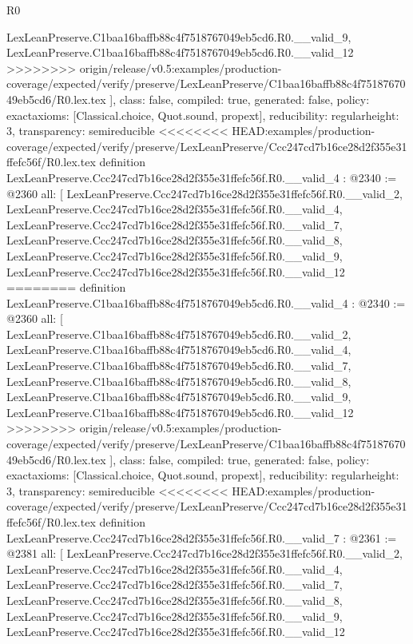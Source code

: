 \begin{lexlean}{R0}
\begin{coremodule}
{{{{{{{{{{{{{{{{{{{{{{{{{{{{{{{{{{{{{{{{{{{{{    LexLeanPreserve.C1baa16baffb88c4f7518767049eb5cd6.R0.__valid_9,
    LexLeanPreserve.C1baa16baffb88c4f7518767049eb5cd6.R0.__valid_12
>>>>>>>> origin/release/v0.5:examples/production-coverage/expected/verify/preserve/LexLeanPreserve/C1baa16baffb88c4f7518767049eb5cd6/R0.lex.tex
  ],
  class: false,
  compiled: true,
  generated: false,
  policy: exact{axioms: [Classical.choice, Quot.sound, propext]},
  reducibility: regular{height: 3},
  transparency: semireducible
}
<<<<<<<< HEAD:examples/production-coverage/expected/verify/preserve/LexLeanPreserve/Ccc247cd7b16ce28d2f355e31ffefc56f/R0.lex.tex
definition LexLeanPreserve.Ccc247cd7b16ce28d2f355e31ffefc56f.R0.__valid_4 : @2340 := @2360 {
  all: [
    LexLeanPreserve.Ccc247cd7b16ce28d2f355e31ffefc56f.R0.__valid_2,
    LexLeanPreserve.Ccc247cd7b16ce28d2f355e31ffefc56f.R0.__valid_4,
    LexLeanPreserve.Ccc247cd7b16ce28d2f355e31ffefc56f.R0.__valid_7,
    LexLeanPreserve.Ccc247cd7b16ce28d2f355e31ffefc56f.R0.__valid_8,
    LexLeanPreserve.Ccc247cd7b16ce28d2f355e31ffefc56f.R0.__valid_9,
    LexLeanPreserve.Ccc247cd7b16ce28d2f355e31ffefc56f.R0.__valid_12
========
definition LexLeanPreserve.C1baa16baffb88c4f7518767049eb5cd6.R0.__valid_4 : @2340 := @2360 {
  all: [
    LexLeanPreserve.C1baa16baffb88c4f7518767049eb5cd6.R0.__valid_2,
    LexLeanPreserve.C1baa16baffb88c4f7518767049eb5cd6.R0.__valid_4,
    LexLeanPreserve.C1baa16baffb88c4f7518767049eb5cd6.R0.__valid_7,
    LexLeanPreserve.C1baa16baffb88c4f7518767049eb5cd6.R0.__valid_8,
    LexLeanPreserve.C1baa16baffb88c4f7518767049eb5cd6.R0.__valid_9,
    LexLeanPreserve.C1baa16baffb88c4f7518767049eb5cd6.R0.__valid_12
>>>>>>>> origin/release/v0.5:examples/production-coverage/expected/verify/preserve/LexLeanPreserve/C1baa16baffb88c4f7518767049eb5cd6/R0.lex.tex
  ],
  class: false,
  compiled: true,
  generated: false,
  policy: exact{axioms: [Classical.choice, Quot.sound, propext]},
  reducibility: regular{height: 3},
  transparency: semireducible
}
<<<<<<<< HEAD:examples/production-coverage/expected/verify/preserve/LexLeanPreserve/Ccc247cd7b16ce28d2f355e31ffefc56f/R0.lex.tex
definition LexLeanPreserve.Ccc247cd7b16ce28d2f355e31ffefc56f.R0.__valid_7 : @2361 := @2381 {
  all: [
    LexLeanPreserve.Ccc247cd7b16ce28d2f355e31ffefc56f.R0.__valid_2,
    LexLeanPreserve.Ccc247cd7b16ce28d2f355e31ffefc56f.R0.__valid_4,
    LexLeanPreserve.Ccc247cd7b16ce28d2f355e31ffefc56f.R0.__valid_7,
    LexLeanPreserve.Ccc247cd7b16ce28d2f355e31ffefc56f.R0.__valid_8,
    LexLeanPreserve.Ccc247cd7b16ce28d2f355e31ffefc56f.R0.__valid_9,
    LexLeanPreserve.Ccc247cd7b16ce28d2f355e31ffefc56f.R0.__valid_12
}}}}}}}}}}}}}}}}}}}}}}}}}}}}}}}}}}}}}}}}}}}}}}
\end{coremodule}
\end{lexlean}
